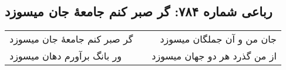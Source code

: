 \begin{center}
\section*{رباعی شماره ۷۸۴: گر صبر کنم جامعهٔ جان میسوزد}
\label{sec:0784}
\begin{longtable}{l p{0.5cm} r}
گر صبر کنم جامعهٔ جان میسوزد
&&
جان من و آن جملگان میسوزد
\\
ور بانگ برآورم دهان میسوزد
&&
از من گذرد هر دو جهان میسوزد
\\
\end{longtable}
\end{center}
